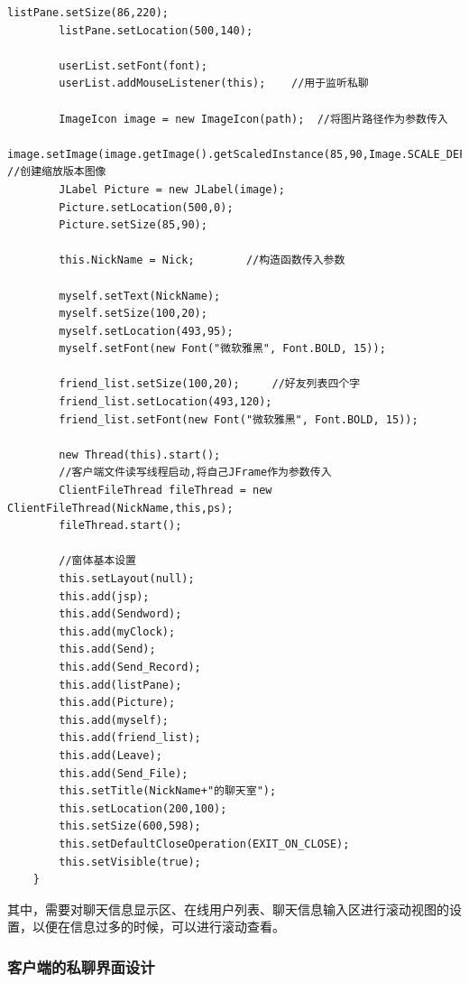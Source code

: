 \documentclass[UTF8,12pt]{article}
\begin{document}
\begin{lstlisting}[title=聊天界面的初始化,frame=shadowbox]
        listPane.setSize(86,220);
        listPane.setLocation(500,140);

        userList.setFont(font);
        userList.addMouseListener(this);    //用于监听私聊

        ImageIcon image = new ImageIcon(path);  //将图片路径作为参数传入
        image.setImage(image.getImage().getScaledInstance(85,90,Image.SCALE_DEFAULT));  //创建缩放版本图像
        JLabel Picture = new JLabel(image);
        Picture.setLocation(500,0);
        Picture.setSize(85,90);

        this.NickName = Nick;        //构造函数传入参数

        myself.setText(NickName);
        myself.setSize(100,20);
        myself.setLocation(493,95);
        myself.setFont(new Font("微软雅黑", Font.BOLD, 15));

        friend_list.setSize(100,20);     //好友列表四个字
        friend_list.setLocation(493,120);
        friend_list.setFont(new Font("微软雅黑", Font.BOLD, 15));

        new Thread(this).start();
        //客户端文件读写线程启动,将自己JFrame作为参数传入
        ClientFileThread fileThread = new ClientFileThread(NickName,this,ps);
        fileThread.start();

        //窗体基本设置
        this.setLayout(null);
        this.add(jsp);
        this.add(Sendword);
        this.add(myClock);
        this.add(Send);
        this.add(Send_Record);
        this.add(listPane);
        this.add(Picture);
        this.add(myself);
        this.add(friend_list);
        this.add(Leave);
        this.add(Send_File);
        this.setTitle(NickName+"的聊天室");
        this.setLocation(200,100);
        this.setSize(600,598);
        this.setDefaultCloseOperation(EXIT_ON_CLOSE);
        this.setVisible(true);
    }
\end{lstlisting}

其中，需要对聊天信息显示区、在线用户列表、聊天信息输入区进行滚动视图的设置，以便在信息过多的时候，可以进行滚动查看。

\subsubsection{客户端的私聊界面设计}
\end{document}
